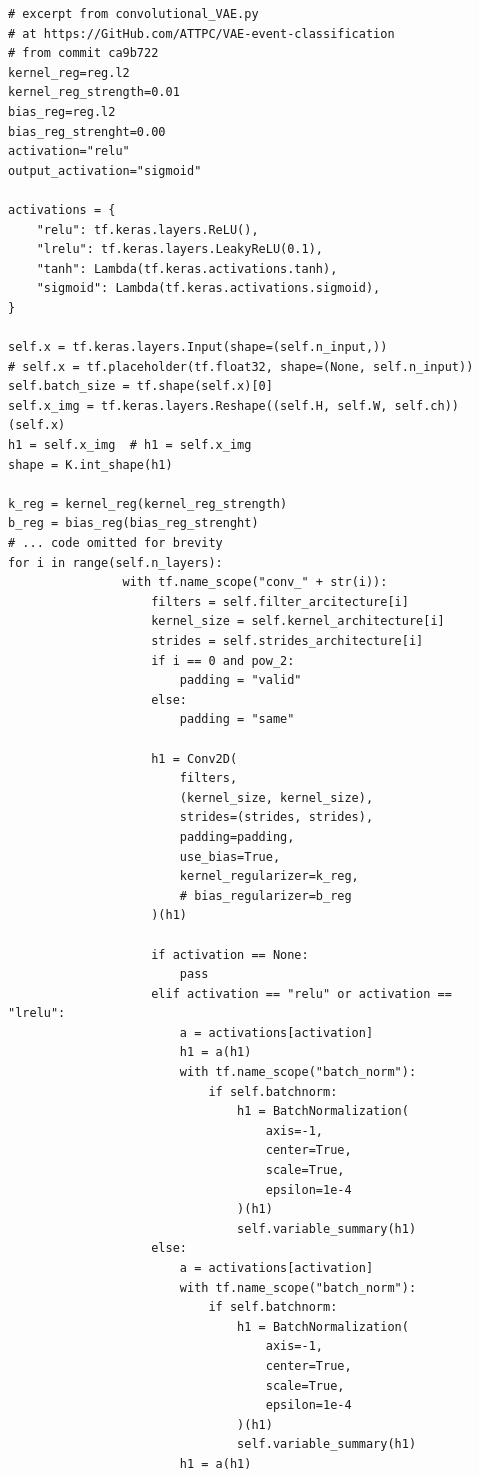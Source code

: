 \begin{lstlisting}[language=iPython]
# excerpt from convolutional_VAE.py
# at https://GitHub.com/ATTPC/VAE-event-classification
# from commit ca9b722
kernel_reg=reg.l2
kernel_reg_strength=0.01
bias_reg=reg.l2
bias_reg_strenght=0.00
activation="relu"
output_activation="sigmoid"

activations = {
    "relu": tf.keras.layers.ReLU(),
    "lrelu": tf.keras.layers.LeakyReLU(0.1),
    "tanh": Lambda(tf.keras.activations.tanh),
    "sigmoid": Lambda(tf.keras.activations.sigmoid),
}

self.x = tf.keras.layers.Input(shape=(self.n_input,))
# self.x = tf.placeholder(tf.float32, shape=(None, self.n_input))
self.batch_size = tf.shape(self.x)[0]
self.x_img = tf.keras.layers.Reshape((self.H, self.W, self.ch))(self.x)
h1 = self.x_img  # h1 = self.x_img
shape = K.int_shape(h1)

k_reg = kernel_reg(kernel_reg_strength)
b_reg = bias_reg(bias_reg_strenght)
# ... code omitted for brevity
for i in range(self.n_layers):
                with tf.name_scope("conv_" + str(i)):
                    filters = self.filter_arcitecture[i]
                    kernel_size = self.kernel_architecture[i]
                    strides = self.strides_architecture[i]
                    if i == 0 and pow_2:
                        padding = "valid"
                    else:
                        padding = "same"

                    h1 = Conv2D(
                        filters,
                        (kernel_size, kernel_size),
                        strides=(strides, strides),
                        padding=padding,
                        use_bias=True,
                        kernel_regularizer=k_reg,
                        # bias_regularizer=b_reg
                    )(h1)

                    if activation == None:
                        pass
                    elif activation == "relu" or activation == "lrelu":
                        a = activations[activation]
                        h1 = a(h1)
                        with tf.name_scope("batch_norm"):
                            if self.batchnorm:
                                h1 = BatchNormalization(
                                    axis=-1,
                                    center=True,
                                    scale=True,
                                    epsilon=1e-4
                                )(h1)
                                self.variable_summary(h1)
                    else:
                        a = activations[activation]
                        with tf.name_scope("batch_norm"):
                            if self.batchnorm:
                                h1 = BatchNormalization(
                                    axis=-1,
                                    center=True,
                                    scale=True,
                                    epsilon=1e-4
                                )(h1)
                                self.variable_summary(h1)
                        h1 = a(h1)


\end{lstlisting}
